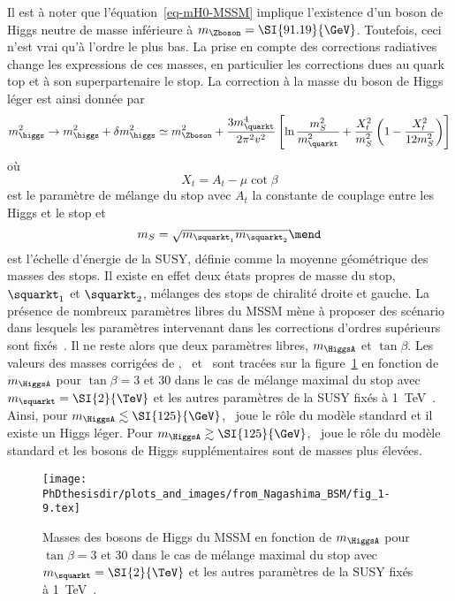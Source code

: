 Il est à noter que l'équation~\eqref{eq-mH0-MSSM} implique l'existence d'un boson de Higgs neutre de masse inférieure à $m_{\Zboson}=\SI{91.19}{\GeV}$.
Toutefois, ceci n'est vrai qu'à l'ordre le plus bas.
La prise en compte des corrections radiatives change les expressions de ces masses, en particulier les corrections dues au quark top et à son superpartenaire le stop.
La correction à la masse du boson de Higgs léger est ainsi donnée par~\cite{Nagashima_BSM}
\begin{equation}
m_{\higgs}^2 \to m_{\higgs}^2 + \delta m_{\higgs}^2
\simeq m_{\Zboson}^2
+ \frac{3 m_{\quarkt}^4}{2 \pi^2 v^2} \left[ \ln\frac{m_S^2}{m_{\quarkt}^2} + \frac{X_t^2}{m_S^2}\left(1-\frac{X_t^2}{12 m_S^2} \right) \right]
\end{equation}
où
\begin{equation}
X_t = A_t - \mu\cot\beta
\end{equation}
est le paramètre de mélange du stop avec $A_t$ la constante de couplage entre les Higgs et le stop
et
\begin{equation}
m_S = \sqrt{m_{\squarkt_1}m_{\squarkt_2}}
\mend
\end{equation}
est l'échelle d'énergie de la SUSY, définie comme la moyenne géométrique des masses des stops.
Il existe en effet deux états propres de masse du stop, $\squarkt_1$ et $\squarkt_2$, mélanges des stops de chiralité droite et gauche.
La présence de nombreux paramètres libres du MSSM mène à proposer des \og scénario \fg{} dans lesquels les paramètres intervenant dans les corrections d'ordres supérieurs sont fixés~\cite{Carena_2013,Bagnaschi_2019}.
Il ne reste alors que deux paramètres libres, $m_{\HiggsA}$ et $\tan\beta$.
Les valeurs des masses corrigées de \higgs, \Higgs\ et \Higgspm\ sont tracées sur la figure~\ref{fig-Higgs_corrected_masses_as_fct_of_mA_and_tanbeta} en fonction de $m_{\HiggsA}$ pour $\tan\beta=3$ et $30$ dans le cas de mélange maximal du stop avec $m_{\squarkt}=\SI{2}{\TeV}$ et les autres paramètres de la SUSY fixés à \SI{1}{\TeV}~\cite{Nagashima_BSM}.
Ainsi, pour $m_{\HiggsA} \lesssim \SI{125}{\GeV}$, \Higgs\ joue le rôle du modèle standard et il existe un Higgs léger.
Pour $m_{\HiggsA} \gtrsim \SI{125}{\GeV}$, \higgs\ joue le rôle du modèle standard et les bosons de Higgs supplémentaires sont de masses plus élevées.
\begin{figure}[h]
\centering
\texttt{[image: \\PhDthesisdir/plots\_and\_images/from\_Nagashima\_BSM/fig\_1-9.tex]}
\caption[Masses des bosons de Higgs du MSSM.]{Masses des bosons de Higgs du MSSM en fonction de $m_{\HiggsA}$ pour $\tan\beta=3$ et $30$ dans le cas de mélange maximal du stop avec $m_{\squarkt}=\SI{2}{\TeV}$ et les autres paramètres de la SUSY fixés à \SI{1}{\TeV}~\cite{Nagashima_BSM}.}
\label{fig-Higgs_corrected_masses_as_fct_of_mA_and_tanbeta}
\end{figure}
